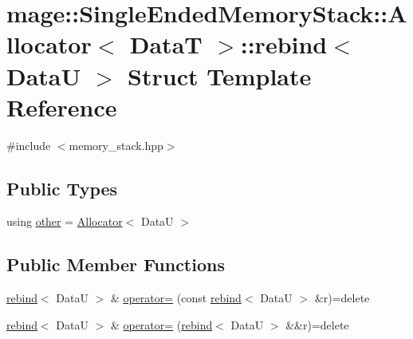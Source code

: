 \hypertarget{structmage_1_1_single_ended_memory_stack_1_1_allocator_1_1rebind}{}\section{mage\+:\+:Single\+Ended\+Memory\+Stack\+:\+:Allocator$<$ DataT $>$\+:\+:rebind$<$ DataU $>$ Struct Template Reference}
\label{structmage_1_1_single_ended_memory_stack_1_1_allocator_1_1rebind}


{\ttfamily \#include $<$memory\+\_\+stack.\+hpp$>$}

\subsection*{Public Types}
\begin{DoxyCompactItemize}
\item 
using \hyperlink{structmage_1_1_single_ended_memory_stack_1_1_allocator_1_1rebind_a8046a39ba6854ffa75978d58b0aafa02}{other} = \hyperlink{structmage_1_1_single_ended_memory_stack_1_1_allocator}{Allocator}$<$ DataU $>$
\end{DoxyCompactItemize}
\subsection*{Public Member Functions}
\begin{DoxyCompactItemize}
\item 
\hyperlink{structmage_1_1_single_ended_memory_stack_1_1_allocator_1_1rebind}{rebind}$<$ DataU $>$ \& \hyperlink{structmage_1_1_single_ended_memory_stack_1_1_allocator_1_1rebind_a4d720811d1c58d5b5eb0d7316f8c5f3a}{operator=} (const \hyperlink{structmage_1_1_single_ended_memory_stack_1_1_allocator_1_1rebind}{rebind}$<$ DataU $>$ \&r)=delete
\item 
\hyperlink{structmage_1_1_single_ended_memory_stack_1_1_allocator_1_1rebind}{rebind}$<$ DataU $>$ \& \hyperlink{structmage_1_1_single_ended_memory_stack_1_1_allocator_1_1rebind_a429bbc7cc8ebca81225731385729f2ff}{operator=} (\hyperlink{structmage_1_1_single_ended_memory_stack_1_1_allocator_1_1rebind}{rebind}$<$ DataU $>$ \&\&r)=delete
\end{DoxyCompactItemize}
